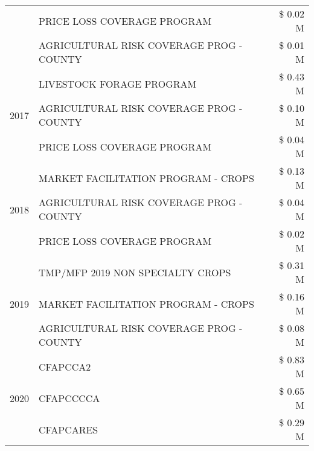 \begin{tabular}{llr}
 & PRICE LOSS COVERAGE PROGRAM & \$ 0.02 M \\
 & AGRICULTURAL RISK COVERAGE PROG - COUNTY & \$ 0.01 M \\
\cline{1-3}
\multirow[t]{3}{*}{2017} & LIVESTOCK FORAGE PROGRAM & \$ 0.43 M \\
 & AGRICULTURAL RISK COVERAGE PROG - COUNTY & \$ 0.10 M \\
 & PRICE LOSS COVERAGE PROGRAM & \$ 0.04 M \\
\cline{1-3}
\multirow[t]{3}{*}{2018} & MARKET FACILITATION PROGRAM - CROPS & \$ 0.13 M \\
 & AGRICULTURAL RISK COVERAGE PROG - COUNTY & \$ 0.04 M \\
 & PRICE LOSS COVERAGE PROGRAM & \$ 0.02 M \\
\cline{1-3}
\multirow[t]{3}{*}{2019} & TMP/MFP 2019 NON SPECIALTY CROPS & \$ 0.31 M \\
 & MARKET FACILITATION PROGRAM - CROPS & \$ 0.16 M \\
 & AGRICULTURAL RISK COVERAGE PROG - COUNTY & \$ 0.08 M \\
\cline{1-3}
\multirow[t]{3}{*}{2020} & CFAPCCA2 & \$ 0.83 M \\
 & CFAPCCCCA & \$ 0.65 M \\
 & CFAPCARES & \$ 0.29 M \\
\cline{1-3}
\bottomrule
\end{tabular}
